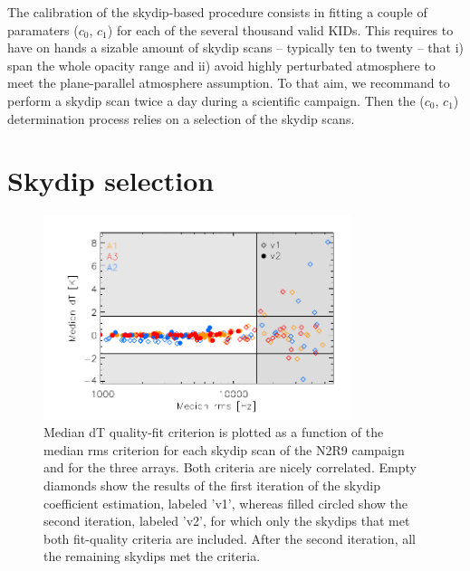 The calibration of the skydip-based procedure consists in fitting a couple of paramaters
($c_0$, $c_1$) for each of the several thousand valid KIDs. This
requires to have on hands a sizable amount of skydip scans --
typically ten to twenty -- that i) span the whole opacity range and
ii) avoid highly perturbated atmosphere to meet the plane-parallel
atmosphere assumption. To that aim, we recommand to perform a skydip
scan twice a day during a scientific campaign. Then the ($c_0$, $c_1$)
determination process relies on a selection of the skydip scans.




\section{Skydip selection}%
\label{se:skydip-selection}

\begin{figure}[ht!]
\begin{center}
\includegraphics[clip=true,width=0.8\textwidth]{Figures/Opacity/plot_skydip_selection_two_crit.pdf}
\caption[N2R9 skydip scan selection.]{ Median dT quality-fit criterion
is plotted as a function of the median rms criterion for each skydip
scan of the N2R9 campaign and for the three arrays. Both criteria are
nicely correlated. Empty diamonds show the results of the first
iteration of the skydip coefficient estimation, labeled 'v1', whereas
filled circled show the second iteration, labeled 'v2', for which only the skydips
that met both fit-quality criteria are included.
After the second iteration, all the remaining skydips met the criteria.}
\label{fig:skydipselection}
\end{center}
\end{figure}

